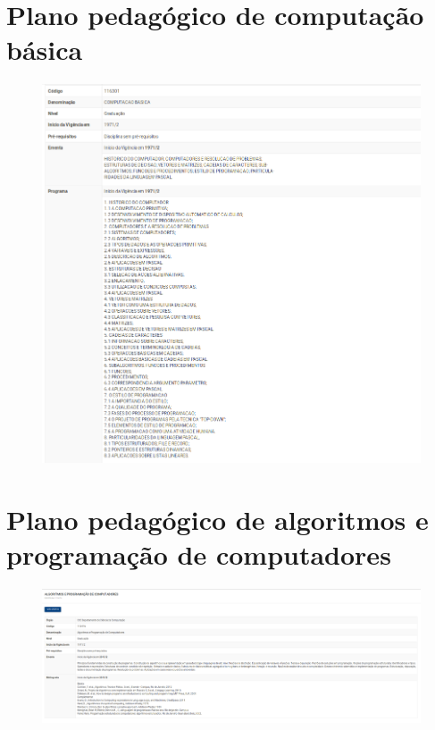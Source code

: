 \begin{anexosenv}

\partanexos

\chapter{Plano pedagógico de computação básica}

\begin{figure}[h]
	\centering
	\includegraphics[keepaspectratio=true,scale=0.6]{figuras/planocb.png}
\end{figure}
\label{planocb}

\chapter{Plano pedagógico de algoritmos e programação de computadores}
\begin{figure}[h]
	\centering
	\includegraphics[keepaspectratio=true,scale=0.6]{figuras/planoapc.png}
\end{figure}
\label{planoapc}


\end{anexosenv}

